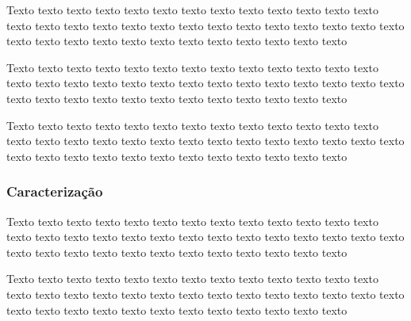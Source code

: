 \label{sec:fonte_falha_complexa}



Texto texto texto texto texto texto texto texto texto texto texto texto texto
texto texto texto texto texto texto texto texto texto texto texto texto texto
texto texto texto texto texto texto texto texto texto texto texto texto texto



\label{sec:fonte_falha_complexa}


Texto texto texto texto texto texto texto texto texto texto texto texto texto
texto texto texto texto texto texto texto texto texto texto texto texto texto
texto texto texto texto texto texto texto texto texto texto texto texto texto



\label{sec:fonte_falha_complexa}


Texto texto texto texto texto texto texto texto texto texto texto texto texto
texto texto texto texto texto texto texto texto texto texto texto texto texto
texto texto texto texto texto texto texto texto texto texto texto texto texto



\subsubsection{Caracterização}
\label{sec:fontes}



Texto texto texto texto texto texto texto texto texto texto texto texto texto
texto texto texto texto texto texto texto texto texto texto texto texto texto
texto texto texto texto texto texto texto texto texto texto texto texto texto



\label{sec:fontes}


Texto texto texto texto texto texto texto texto texto texto texto texto texto
texto texto texto texto texto texto texto texto texto texto texto texto texto
texto texto texto texto texto texto texto texto texto texto texto texto texto


\label{sec:fontes}





